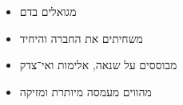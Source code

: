 \documentclass[a3paper, landscape]{report}
\newcommand{\symbolglyph}[1]{{\fontspec{Symbola}#1}}
\newcommand{\altsymbolglyph}[1]{{\fontspec{DejaVu Sans}#1}}
\newcommand{\changesize}[1]{\fontsize{#1}{1.3#1}\normalfont}
\begin{document}
\hspace{4cm}
\begin{minipage}{0.8\linewidth}
\begin{itemize}
	\itemsep2cm
		\renewcommand{\labelitemi}{\LR{\altsymbolglyph{~☠}}}
	\item מגואלים בדם\\
		\renewcommand{\labelitemi}{\LR{\symbolglyph{~💪}}}
	\item משחיתים את החברה והיחיד\\
		\renewcommand{\labelitemi}{\LR{\symbolglyph{~👹}}}
	\item {\changesize{75}מבוססים על שנאה, אלימות ואי־צדק}
		\renewcommand{\labelitemi}{\LR{\symbolglyph{~💰}}}
	\item {\changesize{75}מהווים מעמסה מיותרת ומזיקה}
\end{itemize}
\end{minipage}

\vfill

~

\vfill

~
\end{document}
